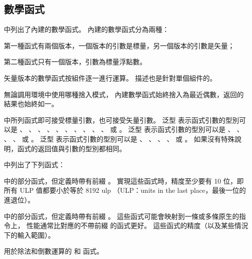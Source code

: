 \subsection[sec:mathFunc]{數學函式}

中列出了內建的數學函式。
內建的數學函式分為兩種：
\startigBase
\item 第一種函式有兩個版本，一個版本的引數是標量，另一個版本的引數是矢量；

\item 第二種函式只有一個版本，引數為標量浮點數。
\stopigBase

矢量版本的數學函式按組件逐一進行運算。
描述也是針對單個組件的。

無論調用環境中使用哪種捨入模式，
內建數學函式始終捨入為最近偶數，返回的結果也始終如一。

中所列函式即可接受標量引數，也可接受矢量引數。
泛型  表示函式引數的型別可以是
 、 、 、 、
 、 、 、 、
 、 、  或 。
泛型  表示函式引數的型別可以是
 、 、 、 、
  或 。
泛型  表示函式引數的型別可以是
 、 、 、 、
  或 。
如果沒有特殊說明，函式的返回值與引數的型別都相同。

{}

中列出了下列函式：
\startigBase
\item {}中的部分函式，但定義時帶有前綴 。
實現這些函式時，精度至少要有 10 位，即所有 ULP 值都要小於等於 8192 ulp
（ULP：units in the last place，最後一位的進退位）。

\item {}中的部分函式，但定義時帶有前綴 。
這些函式可能會映射到一條或多條原生的指令上，
性能通常比對應的不帶前綴  的函式更好。
這些函式的精度（以及某些情況下的輸入範圍）。

\item 用於除法和倒數運算的  和  函式。
\stopigBase

